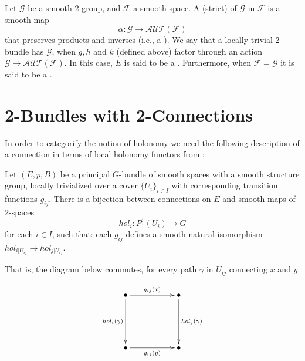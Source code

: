 \begin{definition}\label{g2bundle}
Let $\mathcal{G}$ be a smooth 2-group, and $\mathcal{F}$ a smooth space. A (strict)  of $\mathcal{G}$ in $\mathcal{F}$ is a smooth map \[
                        \alpha:\mathcal{G}\rightarrow \mathcal{AUT}(\mathcal{F})
                       \]
that preserves products and inverses (i.e., a ).
We say that a locally trivial 2-bundle has  $\mathcal{G}$, when $g,h$ and $k$ (defined above) factor through an action $\mathcal{G}\rightarrow\mathcal{AUT}(\mathcal{F})$. In this case, $E$ is said to be a . Furthermore, when $\mathcal{F}=\mathcal{G}$ it is said to be a  .
\end{definition}




\section{2-Bundles with 2-Connections}

In order to categorify the notion of holonomy we need the following description of a connection in terms of local holonomy functors from \cite{baez-2004}:

\begin{theorem}
Let $(E,p,B)$ be a principal $G$-bundle of smooth spaces with a smooth structure group, locally trivialized over a cover $\{ U_i\}_{i\in I}$ with corresponding transition functions $g_{ij}$. There is a bijection between connections on $E$ and smooth maps of 2-spaces \[
hol_i:P^1_1(U_i)\rightarrow G
\]
for each $i\in I$, such that:
each $g_{ij}$ defines a smooth natural isomorphism $hol_{i|U_{ij}}\rightarrow hol_{j|U_{ij}}$.
\end{theorem}


That is, the diagram below commutes, for every path $\gamma$ in $U_{ij}$ connecting $x$ and $y$.

\[
\xymatrix{\bullet \ar[rr]^{g_{ij}(x)} \ar[dd]_{hol_i(\gamma)} & & \bullet \ar[dd]^{hol_j(\gamma)}\\
\\
\bullet \ar[rr]_{g_{ij}(y)} & & \bullet
}
\]


